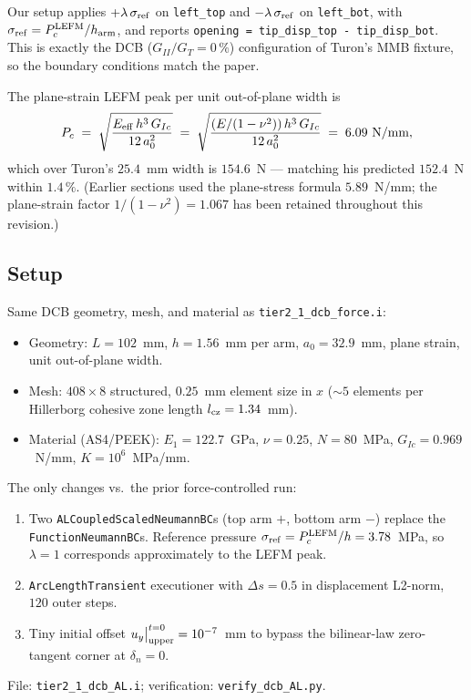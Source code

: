 Our setup applies $+\lambda\,\sigma_{\rm ref}$ on \texttt{left\_top}
and $-\lambda\,\sigma_{\rm ref}$ on \texttt{left\_bot}, with
$\sigma_{\rm ref} = P_c^{\rm LEFM}/h_{\rm arm}$, and reports
\texttt{opening = tip\_disp\_top - tip\_disp\_bot}. This is exactly the
DCB ($G_{II}/G_T = 0\,\%$) configuration of Turon's MMB fixture, so the
boundary conditions match the paper.

The plane-strain LEFM peak per unit out-of-plane width is
\begin{equation}
P_c \;=\; \sqrt{\frac{E_{\rm eff}\,h^3\,G_{Ic}}{12\,a_0^2}}
\;=\; \sqrt{\frac{(E/(1-\nu^2))\,h^3\,G_{Ic}}{12\,a_0^2}}
\;=\; 6.09~\text{N/mm},
\end{equation}
which over Turon's $25.4$~mm width is $154.6$~N — matching his
predicted $152.4$~N within $1.4\,\%$. (Earlier sections used the
plane-stress formula $5.89$~N/mm; the plane-strain factor
$1/(1-\nu^2) = 1.067$ has been retained throughout this revision.)

\subsection{Setup}

Same DCB geometry, mesh, and material as
\texttt{tier2\_1\_dcb\_force.i}:
\begin{itemize}
\item Geometry: $L = 102$~mm, $h = 1.56$~mm per arm,
      $a_0 = 32.9$~mm, plane strain, unit out-of-plane width.
\item Mesh: $408 \times 8$ structured, $0.25$~mm element size in $x$
      ($\sim 5$ elements per Hillerborg cohesive zone length
      $l_{\rm cz} = 1.34$~mm).
\item Material (AS4/PEEK): $E_1 = 122.7$~GPa, $\nu = 0.25$,
      $N = 80$~MPa, $G_{Ic} = 0.969$~N/mm, $K = 10^{6}$~MPa/mm.
\end{itemize}

The only changes vs.\ the prior force-controlled run:
\begin{enumerate}
\item Two \texttt{ALCoupledScaledNeumannBC}s (top arm $+$,
      bottom arm $-$) replace the \texttt{FunctionNeumannBC}s. Reference
      pressure $\sigma_{\rm ref} = P_c^{\rm LEFM}/h = 3.78$~MPa, so
      $\lambda = 1$ corresponds approximately to the LEFM peak.
\item \texttt{ArcLengthTransient} executioner with $\Delta s = 0.5$ in
      displacement L2-norm, $120$ outer steps.
\item Tiny initial offset $u_y\big|_{\rm upper}^{t=0} = 10^{-7}$~mm to
      bypass the bilinear-law zero-tangent corner at $\delta_n = 0$.
\end{enumerate}
File: \texttt{tier2\_1\_dcb\_AL.i}; verification:
\texttt{verify\_dcb\_AL.py}.

